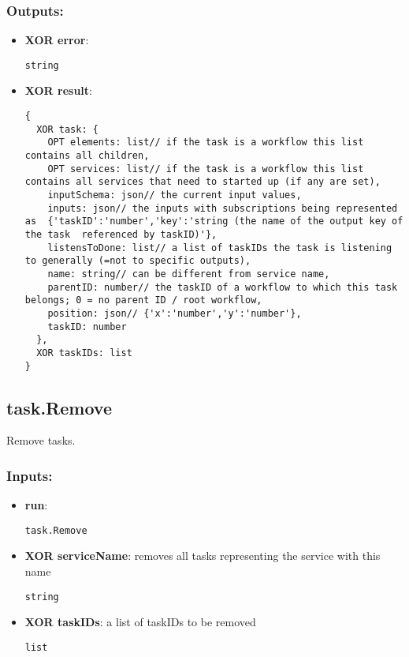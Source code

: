 \subsubsection*{Outputs:}
\begin{itemize}
    \item \textbf{XOR error}: 
\begin{lstlisting}
string
\end{lstlisting}
    \item \textbf{XOR result}: 
\begin{lstlisting}
{
  XOR task: {
    OPT elements: list// if the task is a workflow this list contains all children, 
    OPT services: list// if the task is a workflow this list contains all services that need to started up (if any are set), 
    inputSchema: json// the current input values, 
    inputs: json// the inputs with subscriptions being represented as  {'taskID':'number','key':'string (the name of the output key of the task  referenced by taskID)'}, 
    listensToDone: list// a list of taskIDs the task is listening to generally (=not to specific outputs), 
    name: string// can be different from service name, 
    parentID: number// the taskID of a workflow to which this task belongs; 0 = no parent ID / root workflow, 
    position: json// {'x':'number','y':'number'}, 
    taskID: number
  }, 
  XOR taskIDs: list
}
\end{lstlisting}
  \end{itemize}

\subsection{task.Remove}
\label{ch:builtinservices:task.Remove}
Remove tasks.
\subsubsection*{Inputs:}
\begin{itemize}
    \item \textbf{run}: 
\begin{lstlisting}
task.Remove
\end{lstlisting}
    \item \textbf{XOR serviceName}: removes all tasks representing the service with this name
\begin{lstlisting}
string
\end{lstlisting}
    \item \textbf{XOR taskIDs}: a list of taskIDs to be removed
\begin{lstlisting}
list
\end{lstlisting}
  \end{itemize}

